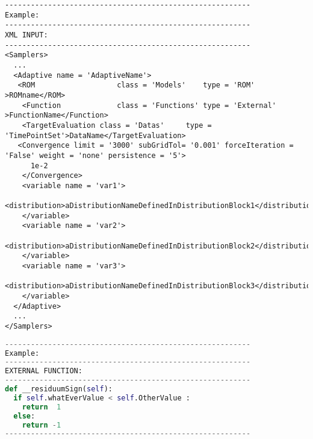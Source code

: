 \begin{lstlisting}[style=XML]
---------------------------------------------------------
Example:
---------------------------------------------------------
XML INPUT:
---------------------------------------------------------
<Samplers>
  ...
  <Adaptive name = 'AdaptiveName'>
   <ROM                   class = 'Models'    type = 'ROM'            >ROMname</ROM>
    <Function             class = 'Functions' type = 'External'      >FunctionName</Function>
    <TargetEvaluation class = 'Datas'     type = 'TimePointSet'>DataName</TargetEvaluation>
   <Convergence limit = '3000' subGridTol= '0.001' forceIteration = 'False' weight = 'none' persistence = '5'>
      1e-2
    </Convergence>
    <variable name = 'var1'>
        <distribution>aDistributionNameDefinedInDistributionBlock1</distribution> 
    </variable>
    <variable name = 'var2'>
        <distribution>aDistributionNameDefinedInDistributionBlock2</distribution> 
    </variable>
    <variable name = 'var3'>
        <distribution>aDistributionNameDefinedInDistributionBlock3</distribution> 
    </variable>
  </Adaptive>
  ...
</Samplers>
\end{lstlisting}
\begin{lstlisting}[language=python]
---------------------------------------------------------
Example:
---------------------------------------------------------
EXTERNAL FUNCTION:
---------------------------------------------------------
def __residuumSign(self):
  if self.whatEverValue < self.OtherValue :
    return  1
  else:
    return -1
---------------------------------------------------------
\end{lstlisting}

